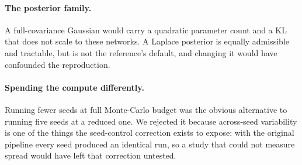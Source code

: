 \begin{uomappendix}
    \paragraph{The posterior family.} A full-covariance Gaussian would carry a
    quadratic parameter count and a KL that does not scale to these networks. A
    Laplace posterior is equally admissible and tractable, but is not the
    reference's default, and changing it would have confounded the reproduction.

    \paragraph{Spending the compute differently.} Running fewer seeds at full
    Monte-Carlo budget was the obvious alternative to running five seeds at a
    reduced one. We rejected it because across-seed variability is one of the
    things the seed-control correction exists to expose: with the original
    pipeline every seed produced an identical run, so a study that could not
    measure spread would have left that correction untested.


\end{uomappendix}
